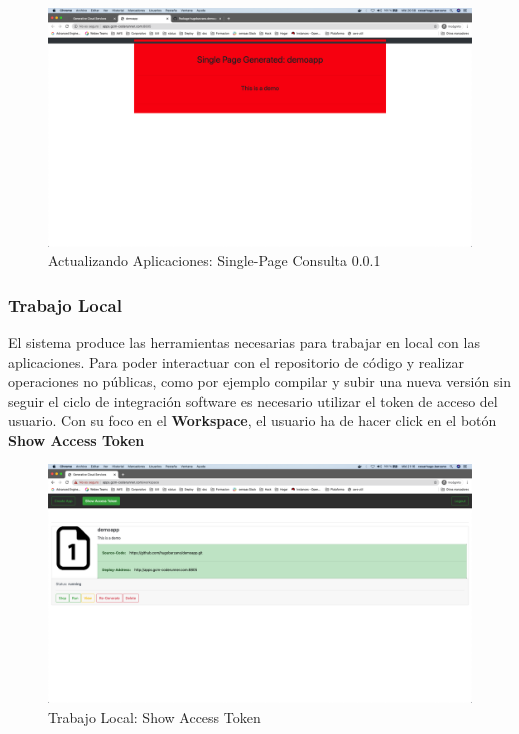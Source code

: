 \documentclass[a4paper,11pt]{book}
\begin{document}
 
   \begin{figure}[H]
\centering
\includegraphics[scale=0.2]{imagenes/casouso/2_12.png}
\caption{  Actualizando Aplicaciones: Single-Page Consulta 0.0.1 }
\end{figure}

\subsubsection{Trabajo Local}

El sistema produce las herramientas necesarias para trabajar en local con las aplicaciones. Para poder interactuar con el repositorio de código y realizar operaciones no públicas, como por ejemplo compilar y subir una nueva versión sin seguir el ciclo de integración software es necesario utilizar el token de acceso del usuario. Con su foco en el \textbf{Workspace}, el usuario ha de hacer click en el botón \textbf{Show Access Token}

   \begin{figure}[H]
\centering
\includegraphics[scale=0.2]{imagenes/casouso/3_1.png}
\caption{  Trabajo Local:  Show Access Token}
\end{figure}
\end{document}
